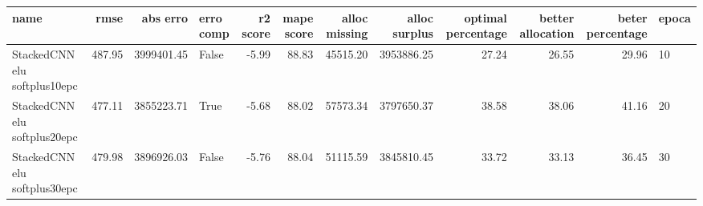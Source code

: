 \begin{tabular}{lrrlrrrrrrrl}
\toprule
name & rmse & abs erro & erro comp & r2 score & mape score & alloc missing & alloc surplus & optimal percentage & better allocation & beter percentage & epoca \\
\midrule
StackedCNN elu softplus10epc & 487.95 & 3999401.45 & False & -5.99 & 88.83 & 45515.20 & 3953886.25 & 27.24 & 26.55 & 29.96 & 10 \\
StackedCNN elu softplus20epc & 477.11 & 3855223.71 & True & -5.68 & 88.02 & 57573.34 & 3797650.37 & 38.58 & 38.06 & 41.16 & 20 \\
StackedCNN elu softplus30epc & 479.98 & 3896926.03 & False & -5.76 & 88.04 & 51115.59 & 3845810.45 & 33.72 & 33.13 & 36.45 & 30 \\
\bottomrule
\end{tabular}
